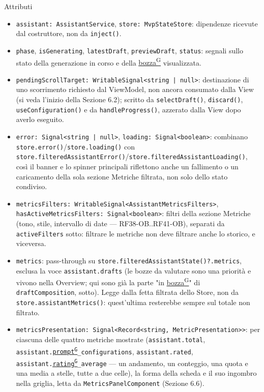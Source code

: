 \documentclass[a4paper,12pt]{article}
\providecommand{\glslink}[2]{\href{https://alittlebyte-19.github.io/Documentazione/glossario.html\#gls-#1}{\underline{#2}\textsuperscript{\scriptsize G}}}
\begin{document}
\begin{sloppypar}
Attributi
\begin{itemize}\raggedright
    \item \texttt{assistant: AssistantService}, \texttt{store: MvpStateStore}: dipendenze ricevute dal costruttore, non da \texttt{inject()}.
    \item \texttt{phase}, \texttt{isGenerating}, \texttt{latestDraft}, \texttt{previewDraft}, \texttt{status}: segnali sullo stato della generazione in corso e della \glslink{bozza-draft}{bozza} visualizzata.
    \item \texttt{pendingScrollTarget: WritableSignal<string | null>}: destinazione di uno scorrimento richiesto dal ViewModel, non ancora consumato dalla View (si veda l'inizio della Sezione 6.2); scritto da \texttt{selectDraft()}, \texttt{discard()}, \texttt{useConfiguration()} e da \texttt{handleProgress()}, azzerato dalla View dopo averlo eseguito.
    \item \texttt{error: Signal<string | null>}, \texttt{loading: Signal<boolean>}: combinano \texttt{store.error()}/\texttt{store.loading()} con \texttt{store.filteredAssistantError()}/\texttt{store.filteredAssistantLoading()}, così il banner e lo spinner principali riflettono anche un fallimento o un caricamento della sola sezione Metriche filtrata, non solo dello stato condiviso.
    \item \texttt{metricsFilters: WritableSignal<AssistantMetricsFilters>}, \texttt{hasActiveMetricsFilters: Signal<boolean>}: filtri della sezione Metriche (tono, stile, intervallo di date — RF38-OB..RF41-OB), separati da \texttt{activeFilters} sotto: filtrare le metriche non deve filtrare anche lo storico, e viceversa.
    \item \texttt{metrics}: pass-through su \texttt{store.filteredAssistantState()?.metrics}, esclusa la voce \texttt{assistant.drafts} (le bozze da valutare sono una priorità e vivono nella Overview; qui sono già la parte "in \glslink{bozza-draft}{bozza}" di \texttt{draftComposition}, sotto). Legge dalla fetta filtrata dello Store, non da \texttt{store.assistantMetrics()}: quest'ultima resterebbe sempre sul totale non filtrato.
    \item \texttt{metricsPresentation: Signal<Record<string, MetricPresentation>>}: per ciascuna delle quattro metriche mostrate (\texttt{assistant.total}, \texttt{assistant.\glslink{prompt}{prompt}\_configurations}, \texttt{assistant.rated}, \texttt{assistant.\glslink{rating}{rating}\_average} — un andamento, un conteggio, una quota e una media a stelle, tutte a due celle), la forma della scheda e il suo ingombro nella griglia, letta da \texttt{MetricsPanelComponent} (Sezione 6.6).

\end{itemize}
\end{sloppypar}
\end{document}
